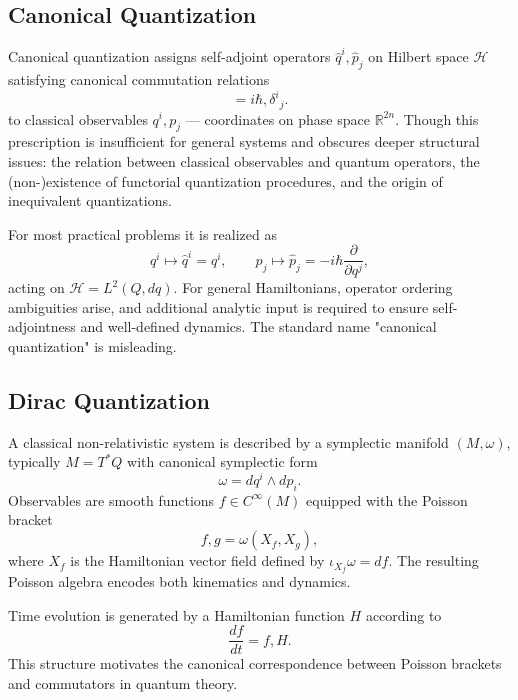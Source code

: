 \subsection {Canonical Quantization}
\label{canonical-quantization}

Canonical quantization assigns self-adjoint operators $\hat q^i, \hat p_j$ on Hilbert space $ \mathcal{H} $
satisfying canonical commutation relations
\begin{equation}
[\hat q^i, \hat p_j] = i\hbar , \delta^i{}_j.
\end{equation}
to classical observables $q^i, p_j$ --- coordinates on phase space $ \mathbb{R}^{2 n} $.
Though this prescription is insufficient for general systems and obscures deeper structural issues: 
the relation between classical observables and quantum operators, the (non-)existence of functorial 
quantization procedures, and the origin of inequivalent quantizations. 

For most practical problems it is realized as
\begin{equation}
q^i \mapsto \hat q^i = q^i, \qquad p_j \mapsto \hat p_j = -i\hbar \frac{\partial}{\partial q^j},
\end{equation}
acting on $\mathcal{H}=L^2(Q,dq)$. For general Hamiltonians, operator ordering ambiguities arise, 
and additional analytic input is required to ensure self-adjointness and well-defined dynamics.
The standard name "canonical quantization" is misleading.

\subsection{Dirac Quantization}
\label{dirac-quantization}

A classical non-relativistic system is described by a symplectic manifold $(M,\omega)$, 
typically $M=T^*Q$ with canonical symplectic form
\begin{equation}
\omega = dq^i \wedge dp_i.
\end{equation}
Observables are smooth functions $f \in C^\infty(M)$ equipped with the Poisson bracket
\begin{equation}
{f,g} = \omega(X_f,X_g),
\end{equation}
where $X_f$ is the Hamiltonian vector field defined by $\iota_{X_f}\omega = df$. 
The resulting Poisson algebra encodes both kinematics and dynamics.

Time evolution is generated by a Hamiltonian function $H$ according to
\begin{equation}
\frac{df}{dt} = {f,H}.
\end{equation}
This structure motivates the canonical correspondence between Poisson brackets and 
commutators in quantum theory.

